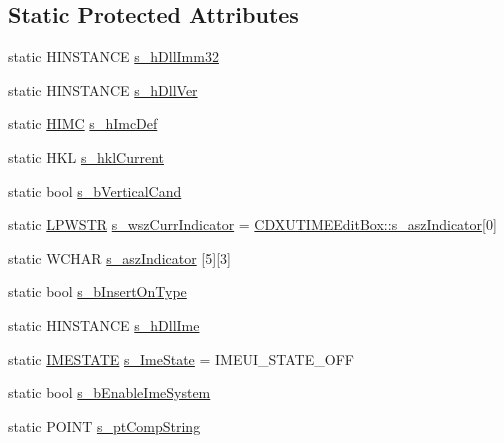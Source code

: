 \subsection*{Static Protected Attributes}
\begin{DoxyCompactItemize}
\item 
static HINSTANCE \hyperlink{class_c_d_x_u_t_i_m_e_edit_box_ade09c72a407c2efe010fed40eac354dd}{s\_\-hDllImm32}
\item 
static HINSTANCE \hyperlink{class_c_d_x_u_t_i_m_e_edit_box_a980f6732a5bd1fbf27e9d0feeaab3fca}{s\_\-hDllVer}
\item 
static \hyperlink{class_c_d_x_u_t_i_m_e_edit_box_aa9afdec726ecd526e2a0abc01537426c}{HIMC} \hyperlink{class_c_d_x_u_t_i_m_e_edit_box_a8923bb4730fb126748d1d38da4de5ae2}{s\_\-hImcDef}
\item 
static HKL \hyperlink{class_c_d_x_u_t_i_m_e_edit_box_a1cc2b2c882ca9512ba1058c6c697f0ec}{s\_\-hklCurrent}
\item 
static bool \hyperlink{class_c_d_x_u_t_i_m_e_edit_box_add6b8ff15715843ade40e9e9325d190b}{s\_\-bVerticalCand}
\item 
static \hyperlink{class_c_d_x_u_t_i_m_e_edit_box_ab64b30f7dfad94f5fdffbe58821da2ff}{LPWSTR} \hyperlink{class_c_d_x_u_t_i_m_e_edit_box_aad444411a488a4cffc4e221338948a86}{s\_\-wszCurrIndicator} = \hyperlink{class_c_d_x_u_t_i_m_e_edit_box_a1f391bcb993b9f6c995f9a972efea9fc}{CDXUTIMEEditBox::s\_\-aszIndicator}\mbox{[}0\mbox{]}
\item 
static WCHAR \hyperlink{class_c_d_x_u_t_i_m_e_edit_box_a1f391bcb993b9f6c995f9a972efea9fc}{s\_\-aszIndicator} \mbox{[}5\mbox{]}\mbox{[}3\mbox{]}
\item 
static bool \hyperlink{class_c_d_x_u_t_i_m_e_edit_box_aabc194ed63ce823d2e37a38b01e924cf}{s\_\-bInsertOnType}
\item 
static HINSTANCE \hyperlink{class_c_d_x_u_t_i_m_e_edit_box_abb6052b511e90fa7118d7cbb6d92989b}{s\_\-hDllIme}
\item 
static \hyperlink{class_c_d_x_u_t_i_m_e_edit_box_ab368d30c2733c242574b8388065d09f2}{IMESTATE} \hyperlink{class_c_d_x_u_t_i_m_e_edit_box_ac2c4d60cd29e91321145867d96d05605}{s\_\-ImeState} = IMEUI\_\-STATE\_\-OFF
\item 
static bool \hyperlink{class_c_d_x_u_t_i_m_e_edit_box_aaf0464cb8cb7d2bea823712c322f2b78}{s\_\-bEnableImeSystem}
\item 
static POINT \hyperlink{class_c_d_x_u_t_i_m_e_edit_box_a784afa5dea8c27e3f6d7ad9972536d4a}{s\_\-ptCompString}
\item 

\end{DoxyCompactItemize}
